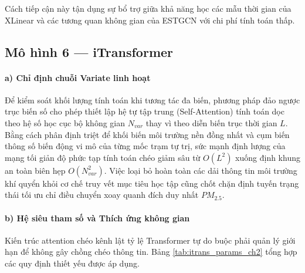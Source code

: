 \noindent Cách tiếp cận này tận dụng sự bổ trợ giữa khả năng học các mẫu thời gian của XLinear và các tương quan không gian của ESTGCN với chi phí tính toán thấp.


\subsection{Mô hình 6 --- iTransformer}

\paragraph{a) Chỉ định chuỗi Variate linh hoạt}

Để kiểm soát khối lượng tính toán khi tương tác đa biến, phương pháp đảo ngược trục biến số cho phép thiết lập hệ tự tập trung (Self-Attention) tính toán dọc theo hệ số học cục bộ không gian $N_{var}$ thay vì theo diễn biến trục thời gian $L$. Bằng cách phân định triệt để khối biến môi trường nền đồng nhất và cụm biến thông số biến động vi mô của từng mốc trạm tự trị, sức mạnh định lượng của mạng tối giản độ phức tạp tính toán chéo giảm sâu từ $O(L^2)$ xuống định khung an toàn biên hẹp $O(N_{var}^2)$. Việc loại bỏ hoàn toàn các dải thông tin môi trường khí quyển khỏi cơ chế truy vết mục tiêu học tập cũng chốt chặn định tuyến trạng thái tối ưu chỉ điều chuyển xoay quanh đích duy nhất $PM_{2.5}$.

\paragraph{b) Hệ siêu tham số và Thích ứng không gian}

Kiến trúc attention chéo kênh lật tỷ lệ Transformer tự do buộc phải quản lý giới hạn để không gây chồng chéo thông tin. Bảng \ref{tab:itrans_params_ch2} tổng hợp các quy định thiết yếu được áp dụng.

